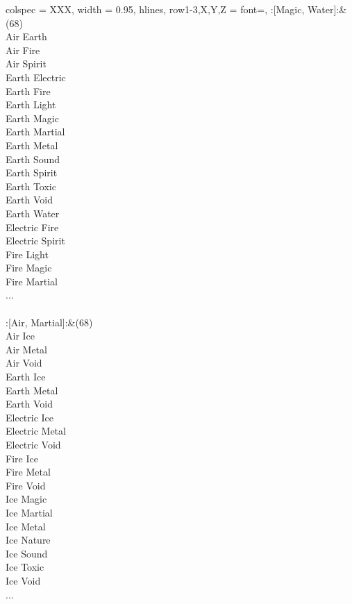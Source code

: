 \begin{longtblr}[
	caption = {2v2 Attacking Effective},
	label = {2v2-Attacking-Effective},
]{
	colspec = {XXX}, width = 0.95\linewidth,
	hlines,
	row{1-3,X,Y,Z} = {font=\bfseries},
}
	:[Magic, Water]:&{(68)\\
	Air Earth \\
	Air Fire \\
	Air Spirit \\
	Earth Electric \\
	Earth Fire \\
	Earth Light \\
	Earth Magic \\
	Earth Martial \\
	Earth Metal \\
	Earth Sound \\
	Earth Spirit \\
	Earth Toxic \\
	Earth Void \\
	Earth Water \\
	Electric Fire \\
	Electric Spirit \\
	Fire Light \\
	Fire Magic \\
	Fire Martial \\
	...\\
	}\\

	:[Air, Martial]:&{(68)\\
	Air Ice \\
	Air Metal \\
	Air Void \\
	Earth Ice \\
	Earth Metal \\
	Earth Void \\
	Electric Ice \\
	Electric Metal \\
	Electric Void \\
	Fire Ice \\
	Fire Metal \\
	Fire Void \\
	Ice Magic \\
	Ice Martial \\
	Ice Metal \\
	Ice Nature \\
	Ice Sound \\
	Ice Toxic \\
	Ice Void \\
	...\\
	}\\


\end{longtblr}
